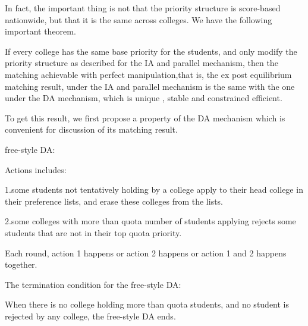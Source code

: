 In fact, the important thing is not that the priority structure is score-based nationwide, but that it is the same across colleges.
We have the following important theorem.

\begin{thm}\label{same}
If every college has the same base priority for the students, and only
modify the priority structure as described for the IA and parallel
mechanism, then the matching achievable with perfect
manipulation,that is, the ex post equilibrium matching result,  under the IA and parallel mechanism  is the same with the one under  the DA mechanism, which is  unique , stable and constrained efficient. 
\end{thm}











To get this result, we first propose a property of the DA mechanism which is convenient for discussion of its matching result.
\begin{definition}
  free-style DA:
  
  Actions includes:
  
  1.some students not tentatively holding by a college apply to their head college in their preference lists, and erase these colleges from the lists.
  
  2.some colleges with more than quota number of students applying rejects some students that are not in their top quota priority.

  Each round, action 1 happens or action 2 happens or action 1 and 2 happens together.
  
  
The termination condition for the free-style DA:

 When there is no college holding more than quota students, and no student is rejected by any college, the free-style DA ends.
\end{definition}

